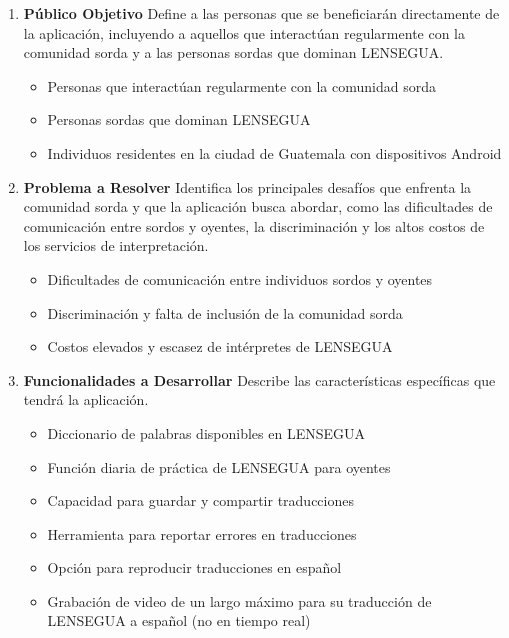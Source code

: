 \begin{enumerate}

    \item \textbf{Público Objetivo} 
    Define a las personas que se beneficiarán directamente de la aplicación, incluyendo a aquellos que interactúan regularmente con la comunidad sorda y a las personas sordas que dominan LENSEGUA.
    \begin{itemize}
        \item Personas que interactúan regularmente con la comunidad sorda
        \item Personas sordas que dominan LENSEGUA
        \item Individuos residentes en la ciudad de Guatemala con dispositivos Android
    \end{itemize}
    
    \item \textbf{Problema a Resolver} 
    Identifica los principales desafíos que enfrenta la comunidad sorda y que la aplicación busca abordar, como las dificultades de comunicación entre sordos y oyentes, la discriminación y los altos costos de los servicios de interpretación.
    \begin{itemize}
        \item Dificultades de comunicación entre individuos sordos y oyentes
        \item Discriminación y falta de inclusión de la comunidad sorda
        \item Costos elevados y escasez de intérpretes de LENSEGUA
    \end{itemize}
    
    \item \textbf{Funcionalidades a Desarrollar} 
    Describe las características específicas que tendrá la aplicación. 
    \begin{itemize}
        \item Diccionario de palabras disponibles en LENSEGUA
        \item Función diaria de práctica de LENSEGUA para oyentes
        \item Capacidad para guardar y compartir traducciones
        \item Herramienta para reportar errores en traducciones
        \item Opción para reproducir traducciones en español
        \item Grabación de video de un largo máximo para su traducción de LENSEGUA a español (no en tiempo real)
    \end{itemize}
    

\end{enumerate}
